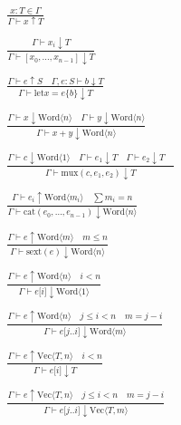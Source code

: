 \documentclass{article}
\newcommand{\judgment}[2]{\ensuremath{#1 \vdash #2}}
\newcommand{\word}[1]{\text{Word}\langle #1 \rangle}
\newcommand{\vect}[2]{\text{Vec}\langle #1, #2 \rangle}
\newcommand{\idx}[1]{\lbrack #1 \rbrack}
\begin{document}
\begin{align*}
    \frac{
        x : T \in \Gamma
    }{
        \judgment{\Gamma}{x \uparrow T}
    } \\
    \\
    \frac{
        \judgment{\Gamma}{x_i \downarrow T}
    }{
        \judgment{\Gamma}{[x_0, \dots, x_{n-1}]  \downarrow T}
    } \\
    \\
    \frac{
        \judgment{\Gamma}{e \uparrow S} \quad
        \judgment{\Gamma, e : S}{b \downarrow T}
    }{
        \judgment{\Gamma}{\text{let} x = e \{ b \} \downarrow T}
    } \\
    \\
    \frac{
        \judgment{\Gamma}{x \downarrow \word{n}} \quad
        \judgment{\Gamma}{y \downarrow \word{n}}
    }{
        \judgment{\Gamma}{x + y \downarrow \word{n}}
    } \\
    \\
    \frac{
        \judgment{\Gamma}{c \downarrow \word{1}} \quad
        \judgment{\Gamma}{e_1 \downarrow T}\quad
        \judgment{\Gamma}{e_2 \downarrow T}\quad
    }{
        \judgment{\Gamma}{\text{mux}(c, e_1, e_2) \downarrow T}
    } \\
    \\
    \frac{
        \judgment{\Gamma}{e_i \uparrow \word{m_i}} \quad
        \sum{m_i} = n
    }{
        \judgment{\Gamma}{\text{cat}(e_0, \dots, e_{n-1}) \downarrow \word{n}}
    } \\
    \\
    \frac{
        \judgment{\Gamma}{e \uparrow \word{m}} \quad
        m \le n
    }{
        \judgment{\Gamma}{\text{sext}(e) \downarrow \word{n}}
    } \\
    \\
    \frac{
        \judgment{\Gamma}{e \uparrow \word{n}} \quad
        i < n
    }{
        \judgment{\Gamma}{e \idx{i} \downarrow \word{1}}
    } \\
    \\
    \frac{
        \judgment{\Gamma}{e \uparrow \word{n}} \quad
        j \le i < n \quad m = j - i
    }{
        \judgment{\Gamma}{e \idx{j..i} \downarrow \word{m}}
    } \\
    \\
    \frac{
        \judgment{\Gamma}{e \uparrow \vect{T}{n}} \quad
        i < n
    }{
        \judgment{\Gamma}{e \idx{i} \downarrow T}
    } \\
    \\
    \frac{
        \judgment{\Gamma}{e \uparrow \vect{T}{n}} \quad
        j \le i < n \quad m = j - i
    }{
        \judgment{\Gamma}{e \idx{j..i} \downarrow \vect{T}{m}}
    } \\
\end{align*}
\end{document}
